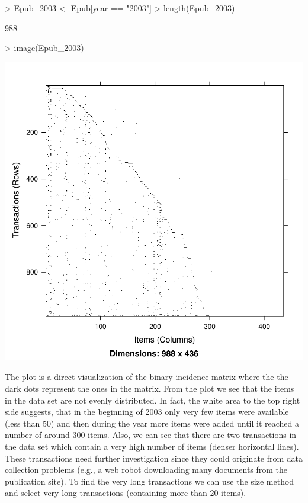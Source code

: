 \documentclass[10pt,a4paper]{article}
\begin{document}
\begin{Schunk}
\begin{Sinput}
> Epub_2003 <- Epub[year == "2003"]
> length(Epub_2003)
\end{Sinput}
\begin{Soutput}
[1] 988
\end{Soutput}
\begin{Sinput}
> image(Epub_2003)
\end{Sinput}
\end{Schunk}
\includegraphics{arules-006}

The plot is a direct visualization of the binary incidence matrix where
the the dark dots represent the ones in the matrix.  From the plot we
see that the items in the data set are not evenly distributed.  In fact,
the white area to the top right side suggests, that in the beginning of
2003 only very few items were available (less than 50) and then during
the year more items were added until it reached a number of around 300
items. Also, we can see that there are two transactions in the data set
which contain a very high number of items (denser horizontal lines).
These transactions need further investigation since they could originate
from data collection problems (e.g., a web robot downloading many
documents from the publication site).  To find the very long
transactions we can use the size method and select very long
transactions (containing more than 20 items).
\end{document}
